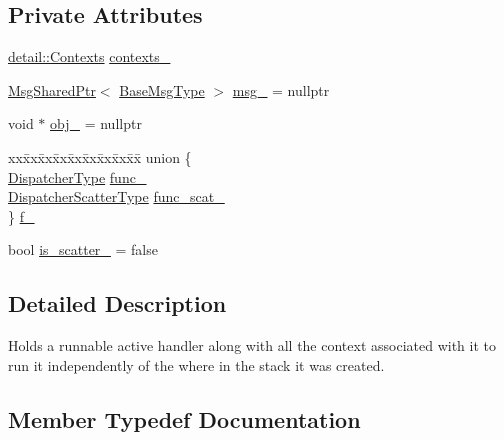 \subsection*{Private Attributes}
\begin{DoxyCompactItemize}
\item 
\hyperlink{structvt_1_1runnable_1_1detail_1_1_contexts}{detail\+::\+Contexts} \hyperlink{structvt_1_1runnable_1_1_runnable_new_a067b986e570ea6cb09eeb46720b27971}{contexts\+\_\+}
\item 
\hyperlink{namespacevt_ab2b3d506ec8e8d1540aede826d84a239}{Msg\+Shared\+Ptr}$<$ \hyperlink{namespacevt_a44d0d4e144748f2b19a1cfd962f50338}{Base\+Msg\+Type} $>$ \hyperlink{structvt_1_1runnable_1_1_runnable_new_a1998ba5d1d29bada29c94d884f906d11}{msg\+\_\+} = nullptr
\item 
void $\ast$ \hyperlink{structvt_1_1runnable_1_1_runnable_new_a42f58780340fa1ddc789aad23daaca7d}{obj\+\_\+} = nullptr
\item 
\begin{tabbing}
xx\=xx\=xx\=xx\=xx\=xx\=xx\=xx\=xx\=\kill
union \{\\
\>\hyperlink{structvt_1_1runnable_1_1_runnable_new_ad0cb55d8e34960ef9dd139638cb721cd}{DispatcherType} \hyperlink{structvt_1_1runnable_1_1_runnable_new_ac73d475f0e3e8aeebb28caefcbcf60e8}{func\_}\\
\>\hyperlink{structvt_1_1runnable_1_1_runnable_new_a1e5173d3a71a30f4901c61b7de4092c6}{DispatcherScatterType} \hyperlink{structvt_1_1runnable_1_1_runnable_new_a0efbf8e5086cf724b0fd0318f9433d8c}{func\_scat\_}\\
\} \hyperlink{structvt_1_1runnable_1_1_runnable_new_af29cbd1944bfb1e592e96c33c8a98d53}{f\_}\\

\end{tabbing}\item 
bool \hyperlink{structvt_1_1runnable_1_1_runnable_new_a5ab5b788e1b0a989be9c1bd62f58af1d}{is\+\_\+scatter\+\_\+} = false
\end{DoxyCompactItemize}


\subsection{Detailed Description}
Holds a runnable active handler along with all the context associated with it to run it independently of the where in the stack it was created. 

\subsection{Member Typedef Documentation}
\mbox{\label{structvt_1_1runnable_1_1_runnable_new_a1e5173d3a71a30f4901c61b7de4092c6}} 
